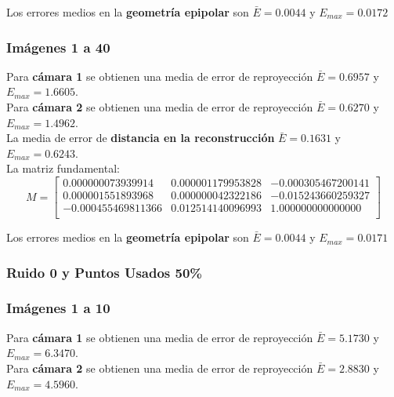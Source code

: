 \documentclass[a4paper, fontsize=11pt]{scrartcl} %
\numberwithin{equation}{section} %
\numberwithin{figure}{section} %
\numberwithin{table}{section} %
\begin{document}
	Los errores medios en la \textbf{geometría epipolar} son $\bar{E} =  0.0044$ y $E_{max} = 0.0172$
	
	\subsubsection*{Imágenes 1 a 40}
	
	Para \textbf{cámara 1} se obtienen una media de error de reproyección $\bar{E} = 0.6957$ y $E_{max} = 1.6605$.\\
	Para \textbf{cámara 2} se obtienen una media de error de reproyección $\bar{E} = 0.6270$ y $E_{max} = 1.4962$.\\
	
	La media de error de \textbf{distancia en la reconstrucción} $\bar{E} = 0.1631$ y $E_{max} = 0.6243$.\\
	La matriz fundamental:
	\[
	M=
	\begin{bmatrix}
	0.000000073939914&	0.000001179953828&	-0.000305467200141 \\
	0.000001551893968&	0.000000042322186&	-0.015243660259327 \\
	-0.000455469811366&	0.012514140096993&	1.000000000000000  \\
	
	\end{bmatrix}
	\]
	
	Los errores medios en la \textbf{geometría epipolar} son $\bar{E} = 0.0044$ y $E_{max} = 0.0171$
	
	
	\subsubsection{Ruido 0 y Puntos Usados 50\%}
	
	\subsubsection*{Imágenes 1 a 10}
	
	Para \textbf{cámara 1} se obtienen una media de error de reproyección $\bar{E} = 5.1730$ y $E_{max} = 6.3470$.\\
	Para \textbf{cámara 2} se obtienen una media de error de reproyección $\bar{E} = 2.8830$ y $E_{max} = 4.5960$.\\
	
\end{document}
